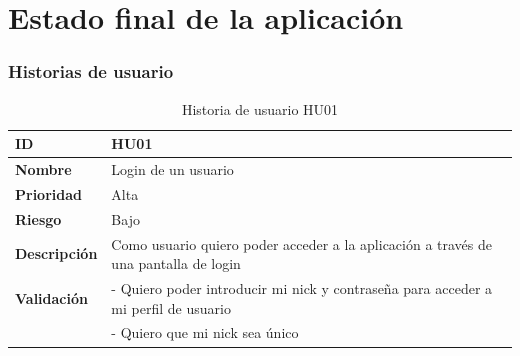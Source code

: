 \chapter{Estado final de la aplicación}\label{cap:estadofinal}




\subsection{Historias de usuario}


\begin{table}[ht!]
\caption{Historia de usuario HU01}
\begin{center}
\begin{tabular}{| m{} | m{} |}
\hline
\textbf{ID} 				& 	HU01 \\ 
\hline
\textbf{Nombre} 				& 	Login de un usuario \\ 
\hline
\textbf{Prioridad}		&	Alta \\
\hline
\textbf{Riesgo}			&	Bajo \\
\hline
\textbf{Descripción}			&	Como usuario quiero poder acceder a la aplicación a través de una pantalla de login \\
\hline
\textbf{Validación}	&	- Quiero poder introducir mi nick y contraseña para acceder a mi perfil de usuario \\
					&	- Quiero que mi nick sea único \\
\hline
\end{tabular}
\end{center}
\end{table}



